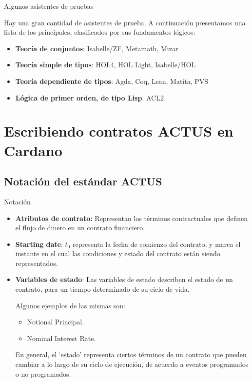 \documentclass{beamer}
\newcommand{\nologo}{\setbeamertemplate{logo}{}} %
\begin{document}
\begin{frame}{Algunos asistentes de pruebas}

Hay una gran cantidad de asistentes de prueba. A continuación presentamos una lista de los principales, clasificados por sus fundamentos lógicos:
\medskip
\pause

\begin{itemize}
    \item \textbf{Teoría de conjuntos}: Isabelle/ZF, Metamath, Mizar
    \item \textbf{Teoría simple de tipos}: HOL4, HOL Light, Isabelle/HOL
    \item \textbf{Teoría dependiente de tipos}: Agda, Coq, Lean, Matita, PVS
    \item \textbf{Lógica de primer orden, de tipo Lisp}: ACL2
\end{itemize}
\end{frame}

\section{Escribiendo contratos ACTUS en Cardano}

\subsection{Notación del estándar ACTUS}

{\nologo
\begin{frame}{Notación}
\medskip

\begin{itemize}
    \item \textbf{Atributos de contrato:} Representan los términos contractuales que definen el flujo de dinero en un contrato financiero.
    \pause
    \item \textbf{Starting date}: $t_0$ representa la fecha de comienzo del contrato, y marca el instante en el cual las condiciones y estado del contrato están siendo representados. 
    \pause
    \item \textbf{Variables de estado}: Las variables de estado describen el estado de un contrato, para un tiempo determinado de su ciclo de vida. 

        Algunos ejemplos de las mismas son: 
        \pause
            \begin{itemize}
                \item Notional Principal.
                \item Nominal Interest Rate.
            \end{itemize}
        \pause
        En general, el ‘estado’ representa ciertos términos de un contrato que pueden cambiar a lo largo de su ciclo de ejecución, de acuerdo a eventos programados o no programados. 
\end{itemize}
\end{frame}
}
\end{document}

